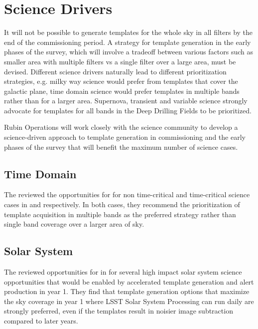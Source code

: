 \section{Science Drivers} \label{sec:science}

It will not be possible to generate templates for the whole sky in all filters by the end of the commissioning period. 
A strategy for template generation in the early phases of the survey, which will involve a tradeoff between various factors such as smaller area with multiple filters vs a single filter over a large area, must be devised. 
Different science drivers naturally lead to different prioritization strategies, e.g. milky way science would prefer from templates that cover the galactic plane, time domain science would prefer templates in multiple bands rather than for a larger area. 
Supernova, transient and variable science strongly advocate for templates for all bands in the Deep Drilling Fields to be prioritized. 

Rubin Operations will work closely with the science community to develop a science-driven approach to template generation in commissioning and the early phases of the survey that will benefit the maximum number of science cases. 

\subsection{Time Domain}

The \tvssc reviewed the opportunities for \es for non time-critical and time-critical science cases in \citep{Hambleton_2020} and \citep{Street_2020} respectively. 
In both cases, they recommend the prioritization of template acquisition in multiple bands as the preferred strategy rather than single band  coverage over a larger area of sky. 

\subsection{Solar System}

The \sssc reviewed opportunities for \es in \citep{2020arXiv201005926L} for several high impact solar system science opportunities that would be enabled by accelerated template generation and alert production in year 1. 
They find that template generation options that maximize the sky coverage in year 1 where LSST Solar System Processing can run daily are strongly preferred, even if the templates result in noisier image subtraction compared to later years.

